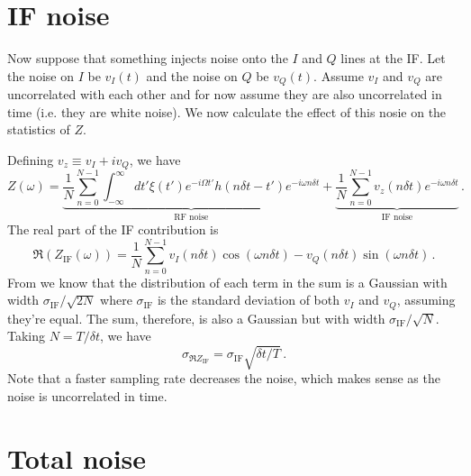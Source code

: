 \section{IF noise}

Now suppose that something injects noise onto the $I$ and $Q$ lines at the IF.
Let the noise on $I$ be $v_I(t)$ and the noise on $Q$ be $v_Q(t)$.
Assume $v_I$ and $v_Q$ are uncorrelated with each other and for now assume they are also uncorrelated in time (i.e. they are white noise).
We now calculate the effect of this nosie on the statistics of $Z$.

Defining $v_z \equiv v_I + i v_Q$, we have
\begin{equation}
Z(\omega) =
\underbrace{\frac{1}{N}\sum_{n=0}^{N-1}\int_{-\infty}^\infty dt' \xi(t')
e^{-i \Omega t'} h(n \delta t - t') e^{-i \omega n \delta t}
}_\text{RF noise}
+
\underbrace{
\frac{1}{N} \sum_{n=0}^{N-1} v_z(n \delta t) e^{-i \omega n \delta t}
}_\text{IF noise}
\, .
\end{equation}
The real part of the IF contribution is
\begin{equation}
  \Re \left( Z_\text{IF} (\omega) \right) = \frac{1}{N} \sum_{n=0}^{N-1}
      v_I(n \delta t) \cos(\omega n \delta t)
    - v_Q(n \delta t) \sin(\omega n \delta t)
  \, .
\end{equation}
From \cite{Sank:whiteNoiseDFT} we know that the distribution of each term in the sum is a Gaussian with width $\sigma_\text{IF} / \sqrt{2N}$ where $\sigma_\text{IF}$ is the standard deviation of both $v_I$ and $v_Q$, assuming they're equal.
The sum, therefore, is also a Gaussian but with width $\sigma_\text{IF} / \sqrt{N}$.
Taking $N = T / \delta t$, we have
\begin{equation}
  \sigma_{\Re Z_\text{IF}} = \sigma_\text{IF} \sqrt{\delta t / T} \, .
\end{equation}
Note that a faster sampling rate decreases the noise, which makes sense as the noise is uncorrelated in time.

\section{Total noise}

